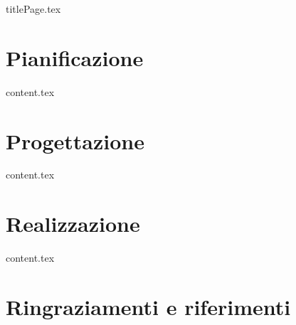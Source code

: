 \documentclass[12pt]{book}
\begin{document}
	{titlePage.tex}
	
	\tableofcontents
	\cleardoublepage
	
	

	\part{Pianificazione}
	{content.tex}
	\part{Progettazione}
	{content.tex}
	\part{Realizzazione}
	{content.tex}
	
	\part{Ringraziamenti e riferimenti}
	
	
\end{document}
